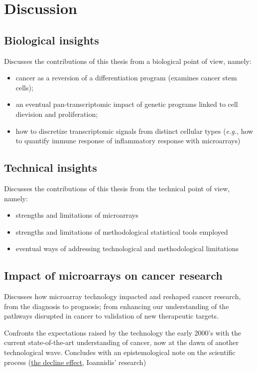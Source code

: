 \documentclass[11pt]{article}
\begin{document}
\section{Discussion}
\label{sec-5}
\subsection{Biological insights}
\label{sec-5-1}
Discusses the contributions of this thesis from a biological point of
view, namely:
\begin{itemize}
\item cancer as a reversion of a differentiation program (examines cancer stem
cells);
\item an eventual pan-transcriptomic impact of genetic programs linked to
cell dievision and proliferation;
\item how to discretize transcriptomic signals from distinct cellular types (\emph{e.g.},
how to quantify immune response of inflammatory response with microarrays)
\end{itemize}

\subsection{Technical insights}
\label{sec-5-2}
Discusses the contributions of this thesis from the technical point of view,
namely:
\begin{itemize}
\item strengths and limitations of microarrays
\item strengths and limitations of methodological statistical tools employed
\item eventual ways of addressing technological and methodological limitations
\end{itemize}

\subsection{Impact of microarrays on cancer research}
\label{sec-5-3}
Discusses how microarray technology impacted and reshaped cancer research,
from the diagnosis to prognosis; from enhancing our understanding of the
pathways disrupted in cancer to validation of new therapeutic targets.

Confronts the expectations raised by the technology the early 2000's with the
current state-of-the-art understanding of cancer, now at the dawn of another
technological wave. Concludes with an epistemological note on the scientific
process (\href{http://www.newyorker.com/reporting/2010/12/13/101213fa_fact_lehrer}{the decline effect}, Ioannidis' research)
\end{document}
